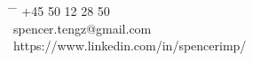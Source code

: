 \documentclass[11pt]{article} %
\begin{document}
{\begin{minipage}[t]{0.70\textwidth}
\end{minipage}\hspace{1mm}
\begin{minipage}[t]{0.33\textwidth}
\begin{tabbing} %
\hspace{3cm} \= \hspace{4cm} \= \kill %
+45 50 12 28 50 \\ %
spencer.tengz@gmail.com \\ %
https://www.linkedin.com/in/spencerimp/ \\ %
\end{tabbing}
\end{minipage}

}
\end{document}
